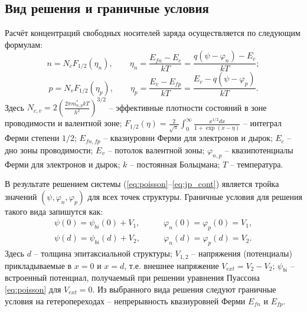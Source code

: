 \documentclass{article}
\begin{document}
\subsection{Вид решения и граничные условия}
Расчёт концентраций свободных носителей заряда осуществляется по следующим
формулам:
\begin{equation*}
    n = N_c F_{1/2}(\eta_n), \qquad
    \eta_n = \frac{E_{fn} - E_c}{kT} = \frac{q(\psi - \varphi_n) - E_c}{kT};
\end{equation*}
\begin{equation*}
    p = N_v F_{1/2}(\eta_p), \qquad
    \eta_p = \frac{E_v - E_{fp}}{kT} = \frac{E_v - q(\psi - \varphi_p)}{kT}.
\end{equation*}
Здесь
$N_{c,v} = 2 \left( \frac{2\pi m_{n,p}^{*} kT}{h^2} \right)^{3/2}$ --
эффективные плотности состояний в зоне проводимости и валентной зоне;
$F_{1/2}(\eta) = \frac{2}{\sqrt{\pi}}\int_0^\infty{\frac{x^{1/2}dx}{1+\exp(x-\eta)}}$
-- интеграл Ферми степени $1/2$;
$E_{fn,fp}$ -- квазиуровни Ферми для электронов и дырок;
$E_c$ -- дно зоны проводимости;
$E_v$ -- потолок валентной зоны;
$\varphi_{n,p}$ -- квазипотенциалы Ферми для электронов и дырок;
$k$ -- постоянная Больцмана; $T$ -- температура.

В результате решением системы (\ref{eq:poisson}--\ref{eq:jp_cont}) является
тройка значений $(\psi, \varphi_n, \varphi_p)$ для всех точек структуры.
Граничные условия для решения такого вида запишутся как:
\begin{align*}
    \psi(0) = \psi_{bi}(0) + V_1, \qquad& \varphi_n(0) = \varphi_p(0) = V_1,\\
    \psi(d) = \psi_{bi}(d) + V_2, \qquad& \varphi_n(d) = \varphi_p(d) = V_2.
\end{align*}
Здесь $d$ -- толщина эпитаксиальной структуры;
$V_{1,2}$ -- напряжения (потенциалы) прикладываемые в $x = 0$ и $x = d$,
т.е. внешнее напряжение $V_{ext} = V_2 - V_2$;
$\psi_{bi}$ -- встроенный потенциал, получаемый при решении уравнения
Пуассона \eqref{eq:poisson} для $V_{ext} = 0$.
Из выбранного вида решения следуют граничные условия на гетеропереходах --
непрерывность квазиуровней Ферми $E_{fn}$ и $E_{fp}$.
\end{document}
